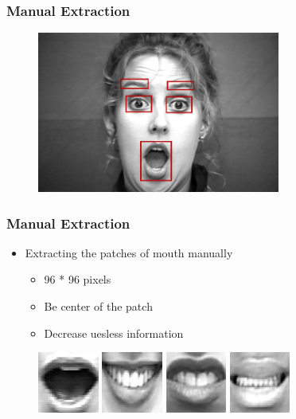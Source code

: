 \documentclass[serif,14pt]{beamer}
\begin{document}
\begin{frame}
  \frametitle{Manual Extraction}
  \begin{figure}[t]
    \centering
    \includegraphics[width=8cm]{face.png}
  \end{figure}
\end{frame}

\begin{frame}
  \frametitle{Manual Extraction}

  \begin{itemize}
      \item Extracting the patches of mouth manually
        \begin{itemize}
          \item 96 * 96 pixels
          \item Be center of the patch\item Decrease uesless information
      	\end{itemize}
  \end{itemize}
  \begin{figure}[t]
    \centering
    \includegraphics[width=2cm]{BW12_7.png}
    \centering
    \includegraphics[width=2cm]{BW19_5.png}
      \centering
    \includegraphics[width=2cm]{dis.png}
      \centering
    \includegraphics[width=2cm]{BW91_4.png}
  \end{figure}
\end{frame}
\end{document}
